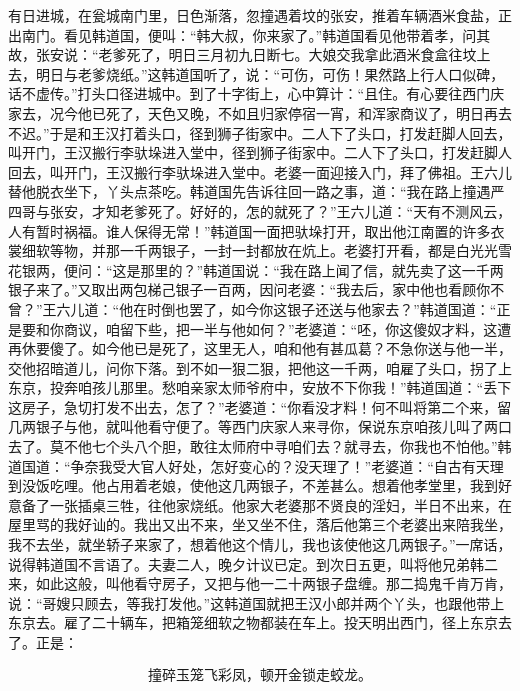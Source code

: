 有日进城，在瓮城南门里，日色渐落，忽撞遇着坟的张安，推着车辆酒米食盐，正出南门。看见韩道国，便叫：“韩大叔，你来家了。”韩道国看见他带着孝，问其故，张安说：“老爹死了，明日三月初九日断七。大娘交我拿此酒米食盒往坟上去，明日与老爹烧纸。”这韩道国听了，说：“可伤，可伤！果然路上行人口似碑，话不虚传。”打头口径进城中。到了十字街上，心中算计：“且住。有心要往西门庆家去，况今他已死了，天色又晚，不如且归家停宿一宵，和浑家商议了，明日再去不迟。”于是和王汉打着头口，径到狮子街家中。二人下了头口，打发赶脚人回去，叫开门，王汉搬行李驮垛进入堂中，径到狮子街家中。二人下了头口，打发赶脚人回去，叫开门，王汉搬行李驮垛进入堂中。老婆一面迎接入门，拜了佛祖。王六儿替他脱衣坐下，丫头点茶吃。韩道国先告诉往回一路之事，道：“我在路上撞遇严四哥与张安，才知老爹死了。好好的，怎的就死了？”王六儿道：“天有不测风云，人有暂时祸福。谁人保得无常！”韩道国一面把驮垛打开，取出他江南置的许多衣裳细软等物，并那一千两银子，一封一封都放在炕上。老婆打开看，都是白光光雪花银两，便问：“这是那里的？”韩道国说：“我在路上闻了信，就先卖了这一千两银子来了。”又取出两包梯己银子一百两，因问老婆：“我去后，家中他也看顾你不曾？”王六儿道：“他在时倒也罢了，如今你这银子还送与他家去？”韩道国道：“正是要和你商议，咱留下些，把一半与他如何？”老婆道：“呸，你这傻奴才料，这遭再休要傻了。如今他已是死了，这里无人，咱和他有甚瓜葛？不急你送与他一半，交他招暗道儿，问你下落。到不如一狠二狠，把他这一千两，咱雇了头口，拐了上东京，投奔咱孩儿那里。愁咱亲家太师爷府中，安放不下你我！”韩道国道：“丢下这房子，急切打发不出去，怎了？”老婆道：“你看没才料！何不叫将第二个来，留几两银子与他，就叫他看守便了。等西门庆家人来寻你，保说东京咱孩儿叫了两口去了。莫不他七个头八个胆，敢往太师府中寻咱们去？就寻去，你我也不怕他。”韩道国道：“争奈我受大官人好处，怎好变心的？没天理了！”老婆道：“自古有天理到没饭吃哩。他占用着老娘，使他这几两银子，不差甚么。想着他孝堂里，我到好意备了一张插桌三牲，往他家烧纸。他家大老婆那不贤良的淫妇，半日不出来，在屋里骂的我好讪的。我出又出不来，坐又坐不住，落后他第三个老婆出来陪我坐，我不去坐，就坐轿子来家了，想着他这个情儿，我也该使他这几两银子。”一席话，说得韩道国不言语了。夫妻二人，晚夕计议已定。到次日五更，叫将他兄弟韩二来，如此这般，叫他看守房子，又把与他一二十两银子盘缠。那二捣鬼千肯万肯，说：“哥嫂只顾去，等我打发他。”这韩道国就把王汉小郎并两个丫头，也跟他带上东京去。雇了二十辆车，把箱笼细软之物都装在车上。投天明出西门，径上东京去了。正是：

\[
撞碎玉笼飞彩凤，顿开金锁走蛟龙。
\]

